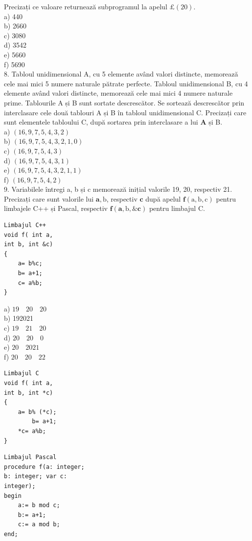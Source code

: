 \documentclass[10pt]{article}
\begin{document}
Precizați ce valoare returnează subprogramul la apelul $\pounds(20)$.\\
a) 440\\
b) 2660\\
c) 3080\\
d) 3542\\
e) 5660\\
f) 5690\\
8. Tabloul unidimensional A, cu 5 elemente având valori distincte, memorează cele mai mici 5 numere naturale pătrate perfecte. Tabloul unidimensional B, cu 4 elemente având valori distincte, memorează cele mai mici 4 numere naturale prime. Tablourile A și B sunt sortate descrescător. Se sortează descrescător prin interclasare cele două tablouri A și B în tabloul unidimensional C. Precizați care sunt elementele tabloului C, după sortarea prin interclasare a lui $\mathbf{A}$ și B.\\
a) $(16,9,7,5,4,3,2)$\\
b) $(16,9,7,5,4,3,2,1,0)$\\
c) $(16,9,7,5,4,3)$\\
d) $(16,9,7,5,4,3,1)$\\
e) $(16,9,7,5,4,3,2,1,1)$\\
f) $(16,9,7,5,4,2)$\\
9. Variabilele întregi a, b și c memorează inițial valorile 19, 20, respectiv 21. Precizați care sunt valorile lui $\mathbf{a}, \mathrm{b}$, respectiv $\mathbf{c}$ după apelul $\mathbf{f}(\mathrm{a}, \mathrm{b}, \mathrm{c})$ pentru limbajele C++ și Pascal, respectiv $\mathbf{f}(\mathbf{a}, \mathrm{b}, \& \mathbf{c})$ pentru limbajul C.

\begin{verbatim}
Limbajul C++
void f( int a,
int b, int &c)
{
    a= b%c;
    b= a+1;
    c= a%b;
}
\end{verbatim}

a) $19 \quad 20 \quad 20$\\
b) 192021\\
c) $19 \quad 21 \quad 20$\\
d) $20 \quad 20 \quad 0$\\
e) $20 \quad 2021$\\
f) $20 \quad 20 \quad 22$

\begin{verbatim}
Limbajul C
void f( int a,
int b, int *c)
{
    a= b% (*c);
        b= a+1;
    *c= a%b;
}
\end{verbatim}

\begin{verbatim}
Limbajul Pascal
procedure f(a: integer;
b: integer; var c:
integer);
begin
    a:= b mod c;
    b:= a+1;
    c:= a mod b;
end;
\end{verbatim}
\end{document}
